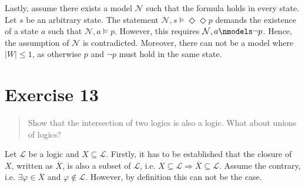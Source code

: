 \documentclass[11pt,a4paper]{article}
\newcommand{\lto}{\supset}
\newcommand{\some}{\Diamond}
\newcommand{\all}{\Box}
\newcommand{\sto}{\Rightarrow}
\begin{document}
\begin{itemize}
Lastly, assume there exists a model $\mathcal{N}$ such that the formula holds in every state. Let $s$ be an arbitrary state. The statement $\mathcal{N}, s \models \some \some p $ demands the existence of a state $a$ such that $\mathcal{N}, a \models p$. However, this requires  $\mathcal{N}, a \nmodels  \neg p$. Hence, the assumption of $\mathcal{N}$ is contradicted. Moreover, there can not be a model where $|W|\leq 1$, as otherwise $p$ and $\neg p$ must hold in the same state.

\end{itemize}

%
%
%



\section*{Exercise 13}
\begin{quote}
Show that the intersection of two logics is also a logic. What about unions of logics?
\end{quote}
Let $\mathcal{L}$ be a logic and $X \subseteq \mathcal{L}$. Firstly, it has to be established that the closure of $X$, written as $\overline{X}$, is also a subset of $\mathcal{L}$, i.e. $X \subseteq \mathcal{L} \sto \overline{X}\subseteq \mathcal{L}$. Assume the contrary, i.e. $\exists \varphi \in \overline{X}$ and $\varphi \notin \mathcal{L}$. However, by definition this can not be the case.
\end{document}
